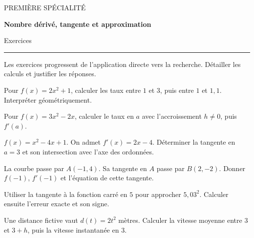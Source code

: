 \documentclass[11pt,a4paper]{article}
\begin{document}
{\small\color{Blue}PREMIÈRE SPÉCIALITÉ}\par{\LARGE\bfseries Nombre dérivé, tangente et approximation}\par{\large Exercices}\par\vspace{0.2cm}\hrule\vspace{0.4cm}
Les exercices progressent de l’application directe vers la recherche. Détailler les calculs et justifier les réponses.
\par\noindent\begin{minipage}{\linewidth}
Pour $f(x)=2x^2+1$, calculer les taux entre $1$ et $3$, puis entre $1$ et $1,1$. Interpréter géométriquement.
\end{minipage}\par
\par\noindent\begin{minipage}{\linewidth}
Pour $f(x)=3x^2-2x$, calculer le taux en $a$ avec l’accroissement $h\ne0$, puis $f\prime(a)$.
\end{minipage}\par
\par\noindent\begin{minipage}{\linewidth}
$f(x)=x^2-4x+1$. On admet $f\prime(x)=2x-4$. Déterminer la tangente en $a=3$ et son intersection avec l’axe des ordonnées.
\end{minipage}\par
\par\noindent\begin{minipage}{\linewidth}
La courbe passe par $A(-1,4)$. Sa tangente en $A$ passe par $B(2,-2)$. Donner $f(-1)$, $f\prime(-1)$ et l’équation de cette tangente.
\end{minipage}\par
\par\noindent\begin{minipage}{\linewidth}
Utiliser la tangente à la fonction carré en $5$ pour approcher $5,03^2$. Calculer ensuite l’erreur exacte et son signe.
\end{minipage}\par
\par\noindent\begin{minipage}{\linewidth}
Une distance fictive vaut $d(t)=2t^2$ mètres. Calculer la vitesse moyenne entre $3$ et $3+h$, puis la vitesse instantanée en $3$.
\end{minipage}\par
\end{document}
